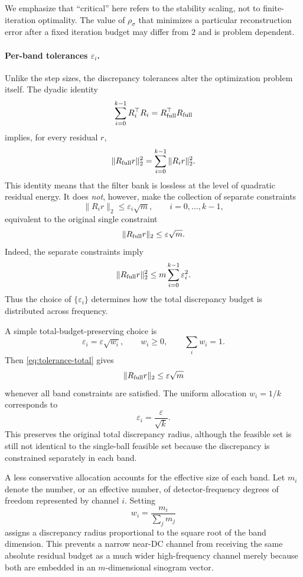 \documentclass{article}
\begin{document}
We emphasize that ``critical'' here refers to the stability scaling,
not to finite-iteration optimality.  The value of $\rho_\sigma$ that
minimizes a particular reconstruction error after a fixed iteration
budget may differ from $2$ and is problem dependent.

\paragraph{Per-band tolerances $\varepsilon_i$.}
Unlike the step sizes, the discrepancy tolerances alter the
optimization problem itself.  The dyadic identity
\begin{equation}
\label{eq:dyadic-energy-identity}
\sum_{i=0}^{k-1}
R_i^\top R_i
=
R_{\rm full}^\top R_{\rm full}
\end{equation}
implies, for every residual $r$,
\begin{equation}
\label{eq:dyadic-residual-energy}
\|R_{\rm full}r\|_2^2
=
\sum_{i=0}^{k-1}\|R_ir\|_2^2.
\end{equation}
This identity means that the filter bank is lossless at the level of
quadratic residual energy.  It does \emph{not}, however, make the
collection of separate constraints
\[
\|R_ir\|_2\le\varepsilon_i\sqrt m,
\qquad i=0,\ldots,k-1,
\]
equivalent to the original single constraint
\[
\|R_{\rm full}r\|_2\le\varepsilon\sqrt m.
\]
Indeed, the separate constraints imply
\begin{equation}
\label{eq:tolerance-total}
\|R_{\rm full}r\|_2^2
\le
m\sum_{i=0}^{k-1}\varepsilon_i^2.
\end{equation}
Thus the choice of $\{\varepsilon_i\}$ determines how the total
discrepancy budget is distributed across frequency.

A simple total-budget-preserving choice is
\begin{equation}
\label{eq:tolerance-budget}
\varepsilon_i
=
\varepsilon\sqrt{w_i},
\qquad
w_i\ge0,
\qquad
\sum_iw_i=1.
\end{equation}
Then \eqref{eq:tolerance-total} gives
\[
\|R_{\rm full}r\|_2
\le
\varepsilon\sqrt m
\]
whenever all band constraints are satisfied.
The uniform allocation $w_i=1/k$ corresponds to
\[
\varepsilon_i=\frac{\varepsilon}{\sqrt{k}}.
\]
This preserves the original total discrepancy radius, although the
feasible set is still not identical to the single-ball feasible set
because the discrepancy is constrained separately in each band.

A less conservative allocation accounts for the effective size of
each band.  Let $m_i$ denote the number, or an effective number, of
detector-frequency degrees of freedom represented by channel $i$.
Setting
\begin{equation}
\label{eq:tolerance-dof}
w_i=\frac{m_i}{\sum_jm_j}
\end{equation}
assigns a discrepancy radius proportional to the square root of the
band dimension.  This prevents a narrow near-DC channel from receiving
the same absolute residual budget as a much wider high-frequency
channel merely because both are embedded in an $m$-dimensional
sinogram vector.
\end{document}
